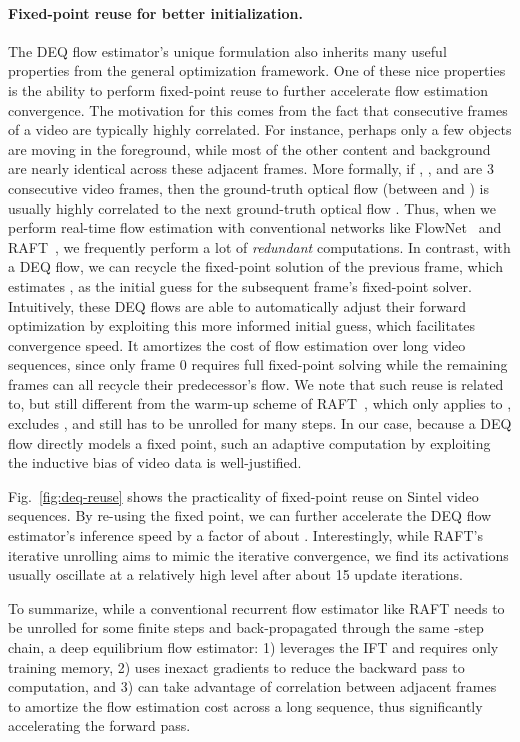 \documentclass[10pt,twocolumn,letterpaper]{article}
\begin{document}
\vspace{-.25cm}
\paragraph{Fixed-point reuse for better initialization.} The DEQ flow estimator's unique formulation also inherits many useful properties from the general optimization framework. One of these nice properties is the ability to perform fixed-point reuse to further accelerate flow estimation convergence. The motivation for this comes from the fact that consecutive frames of a video are typically highly correlated. For instance, perhaps only a few objects are moving in the foreground, while most of the other content and background are nearly identical across these adjacent frames. More formally, if , , and  are 3 consecutive video frames, then the ground-truth optical flow  (between  and ) is usually highly correlated to the next ground-truth optical flow . Thus, when we perform real-time flow estimation with conventional networks like FlowNet~\cite{flownet} and RAFT~\cite{RAFT}, we frequently perform a lot of \emph{redundant} computations. In contrast, with a DEQ flow, we can 
recycle the fixed-point solution  of the previous frame, which estimates , as the initial guess  for the subsequent frame's fixed-point solver. Intuitively, these DEQ flows are able to automatically adjust their forward optimization by exploiting this more informed initial guess, which facilitates convergence speed. It amortizes the cost of flow estimation over long video sequences, since only frame 0 requires full fixed-point solving while the remaining frames can all recycle their predecessor's flow.
We note that such reuse is related to, but still different from the warm-up scheme of RAFT~\cite{RAFT}, which only applies to , excludes , and still has to be unrolled for many steps. In our case, because a DEQ flow directly models a fixed point, such an adaptive computation by exploiting the inductive bias of video data is well-justified.

Fig.~\ref{fig:deq-reuse} shows the practicality of fixed-point reuse on Sintel video sequences. By re-using the fixed point, we can further accelerate the DEQ flow estimator's inference speed by a factor of about . Interestingly, while RAFT's iterative unrolling aims to mimic the iterative convergence, we find its activations usually oscillate at a relatively high level after about 15 update iterations.

To summarize, while a conventional recurrent flow estimator like RAFT needs to be unrolled for some finite  steps and back-propagated through the same -step chain, a deep equilibrium flow estimator: 1) leverages the IFT and requires only  training memory, 2) uses inexact gradients to reduce the backward pass to  computation, and 3) can take advantage of correlation between adjacent frames to amortize the flow estimation cost across a long sequence, thus significantly accelerating the forward pass. 
\end{document}
